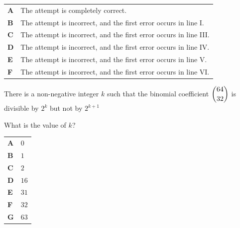 \documentclass[11pt,a4paper]{article}
\begin{document}
\begin{enumerate}[label=\textbf{\arabic*.},leftmargin=*,itemsep=0pt,start=12]
\par\vspace*{12pt}
\begin{tabularx}{\linewidth}{@{}>{\bfseries}l Y@{}}
A &
The attempt is completely correct.
\\[0.8em]
B &
The attempt is incorrect, and the first error occurs in line I.
\\[0.8em]
C &
The attempt is incorrect, and the first error occurs in line III.
\\[0.8em]
D &
The attempt is incorrect, and the first error occurs in line IV.
\\[0.8em]
E &
The attempt is incorrect, and the first error occurs in line V.
\\[0.8em]
F &
The attempt is incorrect, and the first error occurs in line VI.
\\
\end{tabularx}
\end{enumerate}
\clearpage
\thispagestyle{djspaper}
\vspace*{8pt}
\begin{enumerate}[label=\textbf{\arabic*.},leftmargin=*,itemsep=0pt,start=13]
\questionitem[Number]
There is a non-negative integer $k$ such that the binomial coefficient $\dbinom{64}{32}$ is divisible by $2^k$ but not by $2^{k+1}$ 

What is the value of $k$?

\par\vspace*{12pt}
\begin{tabularx}{\linewidth}{@{}>{\bfseries}l Y@{}}
A &
$0$
\\[0.8em]
B &
$1$
\\[0.8em]
C &
$2$
\\[0.8em]
D &
$16$
\\[0.8em]
E &
$31$
\\[0.8em]
F &
$32$
\\[0.8em]
G &
$63$
\\
\end{tabularx}
\end{enumerate}
\end{document}
